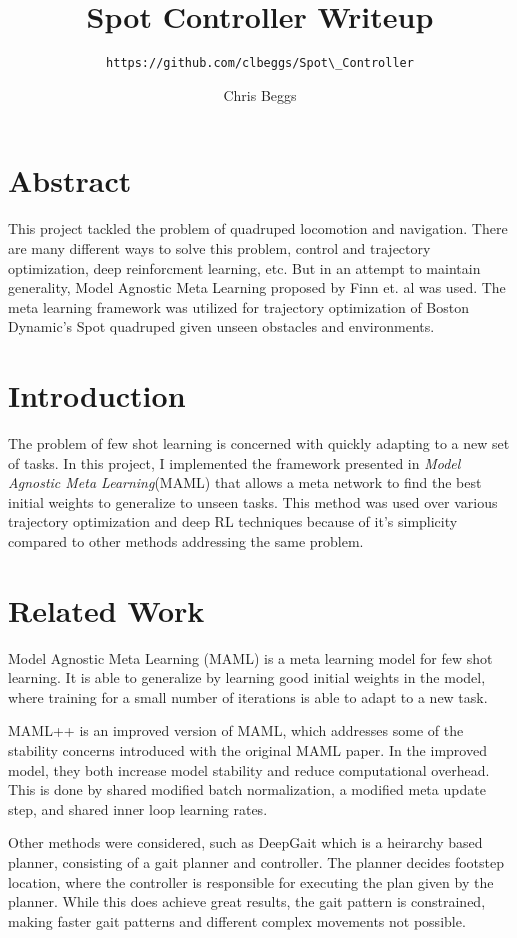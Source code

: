 \documentclass{scrartcl}
\title{Spot Controller Writeup}
\subtitle{\verb`https://github.com/clbeggs/Spot\_Controller`}
\author{Chris Beggs}
\theoremstyle{definition}
\theoremstyle{note}
\begin{document}
\maketitle



\section{Abstract}
This project tackled the problem of quadruped locomotion and navigation.
There are many different ways to solve this problem, control and trajectory
optimization, deep reinforcment learning, etc. 
But in an attempt to maintain generality, Model Agnostic Meta Learning
proposed by Finn et. al\cite{finn} was used. The meta learning framework 
was utilized for trajectory optimization of Boston Dynamic's Spot quadruped
given unseen obstacles and environments.

\section{Introduction}
The problem of few shot learning is concerned with quickly adapting to a new set of tasks.
In this project, I implemented the framework presented in \textit{Model Agnostic Meta Learning}(MAML)\cite{finn} 
that allows a meta network to find the best initial weights to generalize to unseen tasks.
This method was used over various trajectory optimization and deep RL techniques because 
of it's simplicity compared to other methods addressing the same problem.


\section{Related Work}
Model Agnostic Meta Learning (MAML)\cite{finn} is a meta learning model for few shot learning. It is able
to generalize by learning good initial weights in the model, where training for a small number of 
iterations is able to adapt to a new task.

MAML++\cite{imp_maml} is an improved version of MAML, which addresses some of the stability concerns introduced with the original
MAML paper. In the improved model, they both increase model stability and reduce computational overhead. This
is done by shared modified batch normalization, a modified meta update step, and shared inner loop learning rates.

Other methods were considered, such as DeepGait\cite{deepgait} which is a heirarchy based planner, consisting of
a gait planner and controller. The planner decides footstep location, where the controller is responsible for
executing the plan given by the planner. While this does achieve great results, the gait pattern is constrained, 
making faster gait patterns and different complex movements not possible.
\end{document}
